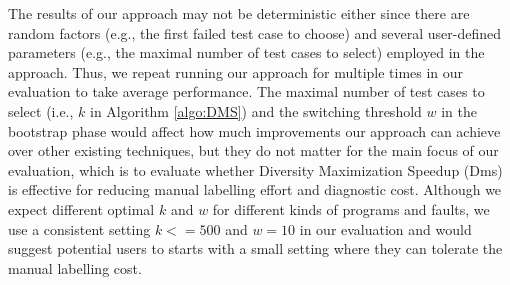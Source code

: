 The results of our approach may not be deterministic either since there are random factors (e.g., the first failed test case to choose) and several user-defined parameters (e.g., the maximal number of test cases to select) employed in the approach. Thus, we repeat running our approach for multiple times in our evaluation to take average performance. The maximal number of test cases to select (i.e., $k$ in Algorithm \ref{algo:DMS}) and the switching threshold $w$ in the bootstrap phase would affect how much improvements our approach can achieve over other existing techniques, but they do not matter for the main focus of our evaluation, which is to evaluate whether Diversity Maximization Speedup ({\sc Dms}) is effective for reducing manual labelling effort and diagnostic cost. Although we expect different optimal $k$ and $w$ for different kinds of programs and faults, we use a consistent setting $k<=500$ and $w=10$ in our evaluation and would suggest potential users to starts with a small setting where they can tolerate the manual labelling cost.
